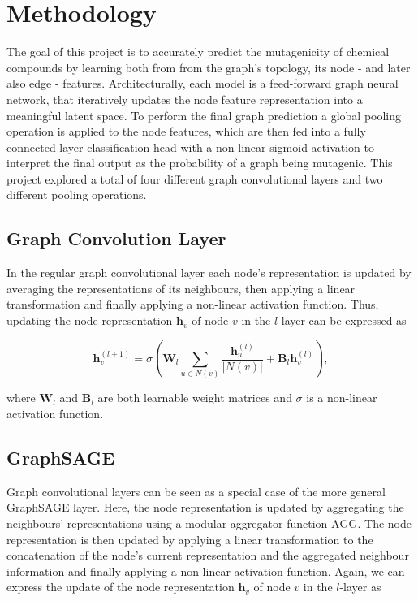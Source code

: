 \documentclass[10pt,conference,compsocconf]{IEEEtran}
\begin{document}
\section{Methodology}

The goal of this project is to accurately predict the mutagenicity of chemical
compounds by learning both from from the graph's topology, its node - and later
also edge - features. Architecturally, each model is a feed-forward graph neural
network, that iteratively updates the node feature representation into a
meaningful latent space. To perform the final graph prediction a global pooling
operation is applied to the node features, which are then fed into a fully
connected layer classification head with a non-linear sigmoid activation to
interpret the final output as the probability of a graph being mutagenic. This
project explored a total of four different graph convolutional layers and two
different pooling operations.

\subsection{Graph Convolution Layer}

In the regular graph convolutional layer each node's representation is updated by
averaging the representations of its neighbours, then applying a linear
transformation and finally applying a non-linear activation function. Thus,
updating the node representation $\mathbf{h}_v$ of node $v$ in the $l$-layer can
be expressed as


\begin{equation}
  \mathbf{h}_v^{(l+1)} = \sigma\left( \mathbf{W}_l \sum_{u\in N(v)}
  \frac{\mathbf{h}_u^{(l)}}{|N(v)|} + \mathbf{B}_l \mathbf{h}_v^{(l)} \right),
\end{equation}

where $\mathbf{W}_l$ and $\mathbf{B}_l$ are both learnable weight matrices and 
$\sigma$ is a non-linear activation function.

\subsection{GraphSAGE}
 
Graph convolutional layers can be seen as a special case of the more general
GraphSAGE layer. Here, the node representation is updated by aggregating the
neighbours' representations using a modular aggregator function $\mathrm{AGG}$.
The node representation is then updated by applying a linear transformation to
the concatenation of the node's current representation and the aggregated
neighbour information and finally applying a non-linear activation function.
Again, we can express the update of the node representation $\mathbf{h}_v$ of
node $v$ in the $l$-layer as
\end{document}
